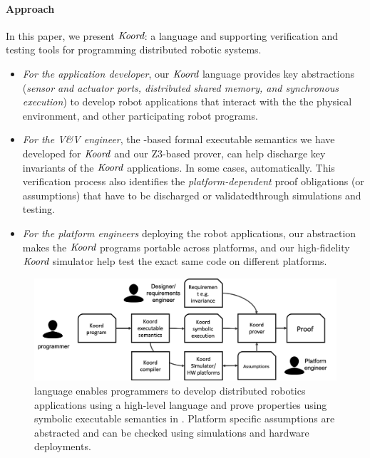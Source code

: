 \paragraph{Approach} In this paper, we present $\emph{Koord}$: a language and supporting verification and testing tools for programming distributed robotic systems. 
\begin{itemize}
\item {\em For the application developer}, our $\emph{Koord}$ language provides key abstractions (\emph{sensor and actuator ports, distributed shared memory, and synchronous execution}) to develop robot applications that interact with the the physical environment, and other participating robot programs.
\item {\em For the V\&V engineer}, the \K-based formal executable semantics we have developed for $\emph{Koord}$ and our Z3-based prover, can help discharge key invariants of the $\emph{Koord}$ applications.  In some cases,  automatically. This verification process also identifies the {\em platform-dependent\/} proof obligations (or assumptions) that have to be discharged or validatedthrough simulations and testing. 
\item {\em For the platform engineers\/} deploying the robot applications, our abstraction makes the $\emph{Koord}$ programs portable across platforms, and our high-fidelity $\emph{Koord}$ simulator help test the exact same code on different platforms.
\end{itemize}

\begin{figure}[h!]
\includegraphics[width=\linewidth]{figs/koorduser.png}
\caption{\small \lgname language  enables programmers to develop distributed robotics applications using a high-level language and prove properties using symbolic executable semantics in \K. Platform specific assumptions are abstracted and can be checked using simulations and hardware deployments.}
\label{fig:koorduser}	
\end{figure}

